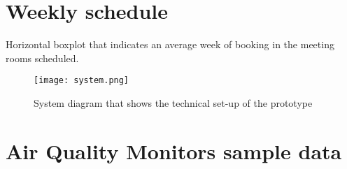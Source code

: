 \begin{appendices}
\section{Weekly schedule}
\label{sec:apx:first_appendix}

Horizontal boxplot that indicates an average week of booking in the meeting rooms scheduled.

\begin{figure}[H]
    \centering
    \texttt{[image: system.png]}
    \caption{System diagram that shows the technical set-up of the prototype}
    \label{fig:timeline}
\end{figure}

\pagebreak

\section{Air Quality Monitors sample data}
\label{sec:apx:first_appendix}




\end{appendices}
